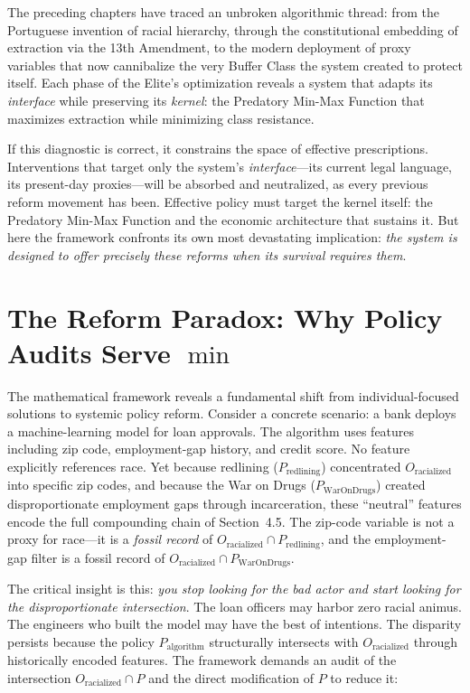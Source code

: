 \documentclass[12pt,openany]{book}
\begin{document}
\medskip

The preceding chapters have traced an unbroken algorithmic thread: from the Portuguese invention of racial hierarchy, through the constitutional embedding of extraction via the 13th Amendment, to the modern deployment of proxy variables that now cannibalize the very Buffer Class the system created to protect itself. Each phase of the Elite's optimization reveals a system that adapts its \textit{interface} while preserving its \textit{kernel}: the Predatory Min-Max Function that maximizes extraction while minimizing class resistance.

If this diagnostic is correct, it constrains the space of effective prescriptions. Interventions that target only the system's \textit{interface}---its current legal language, its present-day proxies---will be absorbed and neutralized, as every previous reform movement has been. Effective policy must target the kernel itself: the Predatory Min-Max Function and the economic architecture that sustains it. But here the framework confronts its own most devastating implication: \textit{the system is designed to offer precisely these reforms when its survival requires them}.

\section{The Reform Paradox: Why Policy Audits Serve \texorpdfstring{$\min$}{min}}

The mathematical framework reveals a fundamental shift from individual-focused solutions to systemic policy reform. Consider a concrete scenario: a bank deploys a machine-learning model for loan approvals. The algorithm uses features including zip code, employment-gap history, and credit score. No feature explicitly references race. Yet because redlining ($P_{\text{redlining}}$) concentrated $O_{\text{racialized}}$ into specific zip codes, and because the War on Drugs ($P_{\text{WarOnDrugs}}$) created disproportionate employment gaps through incarceration, these ``neutral'' features encode the full compounding chain of Section~4.5. The zip-code variable is not a proxy for race---it is a \textit{fossil record} of $O_{\text{racialized}} \cap P_{\text{redlining}}$, and the employment-gap filter is a fossil record of $O_{\text{racialized}} \cap P_{\text{WarOnDrugs}}$.

The critical insight is this: \textit{you stop looking for the bad actor and start looking for the disproportionate intersection}. The loan officers may harbor zero racial animus. The engineers who built the model may have the best of intentions. The disparity persists because the policy $P_{\text{algorithm}}$ structurally intersects with $O_{\text{racialized}}$ through historically encoded features. The framework demands an audit of the intersection $O_{\text{racialized}} \cap P$ and the direct modification of $P$ to reduce it:
\end{document}
